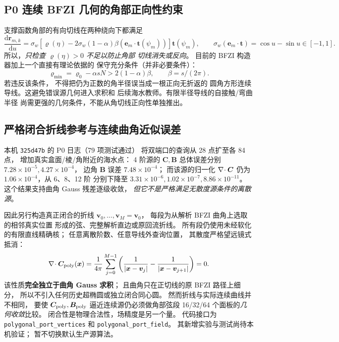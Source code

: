 \subsection{P0 连续 BFZI 几何的角部正向性约束}
支撑函数角部的有向切线在两种绕向下都满足
\[
\frac{\mathrm d\bm r_{m,k}}{\mathrm du}
=\sigma_w\!\left[\varrho(\eta)-
2\sigma_w(1-\alpha)\beta
(\bm e_m\cdot\bm t(\psi_m))\right]\bm t(\psi_m),
\qquad
\sigma_w(\bm e_m\cdot\bm t)=\cos u-\sin u\in[-1,1].
\]
所以，\emph{只检查 $\varrho(\eta)>0$ 不足以防止角部
切线消失或反向}。
目前的 BFZI 构造器加上一个直接有理论依据的
保守充分条件（并非必要条件）：
\[
\boxed{\;
\varrho_{\min}=\varrho_0-\alpha sN
>2(1-\alpha)\beta,\qquad\beta=s/(2\pi).\;}
\]
若违反该条件，
不得把仍为正数的角半径误当成一根正向无折返的
圆角方形连续导线。这避免错误源几何进入求积和
后续海水教师。有限半径导线的自接触/弯曲半径
尚需更强的几何条件，不能从角切线正向性单独推出。

\subsection{严格闭合折线参考与连续曲角近似误差}
本机 \texttt{325d47b} 的 P0 日志（79 项测试通过）
将双端口的查询从 28 点扩至各 84 点，
增加真实盒面/棱/角附近的海水点：
4 阶源的 $\bm C,\bm B$ 总体误差分别
$7.28\times10^{-5},4.27\times10^{-4}$，
边角 $\bm B$ 误差 $7.48\times10^{-4}$；
而该源的归一化 $\nabla\!\cdot\bm C$ 仍为
$1.06\times10^{-4}$，从 6、8、12 阶
分别下降至
$3.31\times10^{-6},1.02\times10^{-7},8.86\times10^{-11}$。
这个结果支持曲角 Gauss 残差逐级收敛，
\emph{但它不是严格满足无散度源条件的离散源}。

因此另行构造真正闭合的折线
$\bm v_0,\ldots,\bm v_M=\bm v_0$，
每段为从解析 BFZI 曲角上选取的相邻真实位置
形成的弦、完整解析直边或原回流折线。
所有段仍使用未经软化的有限直线精确核；
任意离散阶数、任意导线外查询位置，
其散度严格望远镜式抵消：
\[
\nabla\!\cdot\bm C_{\rm poly}(\bm x)
=\frac1{4\pi}\sum_{j=0}^{M-1}
\left(\frac1{|\bm x-\bm v_j|}
-\frac1{|\bm x-\bm v_{j+1}|}\right)
=0.
\]
该性质\textbf{完全独立于曲角 Gauss 求积}；
且曲角只在正切线的原 BFZI 路径上细分，
所以不引入任何历史超椭圆或独立闭合同心圆。
然而折线与实际连续曲线并不相同，
要使 $\bm C_{\rm poly},\bm B_{\rm poly}$
逼近连续源仍必须做角部弦段
16/32/64 个面板的\emph{几何收敛}比较。
闭合性是物理合法性，场精度是另一个量。
代码接口为
\texttt{polygonal\_port\_vertices} 和
\texttt{polygonal\_port\_field}。
其新增实验与测试尚待本机验证；
暂不切换默认生产源算法。


